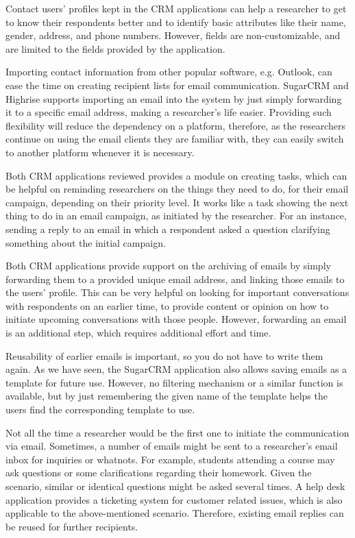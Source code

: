 \begin{compactitem}
	\item Contact users' profiles kept in the \ac{CRM} applications can help a researcher to get to know their respondents better and to identify basic attributes like their name, gender, address, and phone numbers. However, fields are non-customizable, and are limited to the fields provided by the application.
	\item Importing contact information from other popular software, e.g. Outlook, can ease the time on creating recipient lists for email communication. SugarCRM and Highrise supports importing an email into the system by just simply forwarding it to a specific email address, making a researcher's life easier. Providing such flexibility will reduce the dependency on a platform, therefore, as the researchers continue on using the email clients they are familiar with, they can easily switch to another platform whenever it is necessary.
	\item Both \ac{CRM} applications reviewed provides a module on creating tasks, which can be helpful on reminding researchers on the things they need to do, for their email campaign, depending on their priority level. It works like a task showing the next thing to do in an email campaign, as initiated by the researcher. For an instance, sending a reply to an email in which a respondent asked a question clarifying something about the initial campaign.
	\item Both \ac{CRM} applications provide support on the archiving of emails by simply forwarding them to a provided unique email address, and linking those emails to the users' profile. This can be very helpful on looking for important conversations with respondents on an earlier time, to provide content or opinion on how to initiate upcoming conversations with those people. However, forwarding an email is an additional step, which requires additional effort and time.
	\item Reusability of earlier emails is important, so you do not have to write them again. As we have seen, the SugarCRM application also allows saving emails as a template for future use. However, no filtering mechanism or a similar function is available, but by just remembering the given name of the template helps the users find the corresponding template to use.
	\item Not all the time a researcher would be the first one to initiate the communication via email. Sometimes, a number of emails might be sent to a researcher's email inbox for inquiries or whatnots. For example, students attending a course may ask questions or some clarifications regarding their homework. Given the scenario, similar or identical questions might be asked several times. A help desk application provides a ticketing system for customer related issues, which is also applicable to the above-mentioned scenario. Therefore, existing email replies can be reused for further recipients.

\end{compactitem}
